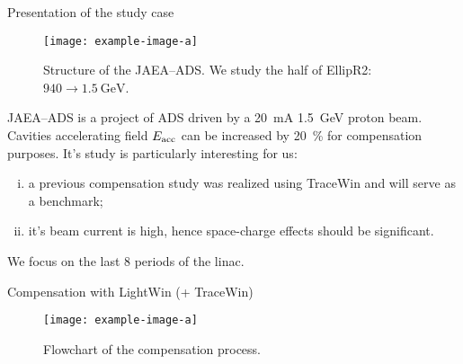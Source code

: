 \begin{frame}[t]
\begin{columns}[t]
\begin{column}{\colwidth}
         \begin{block}{Presentation of the study case}
            \begin{figure}[hbtp]
               \texttt{[image: example-image-a]}
               \caption{%
                  Structure of the JAEA--ADS.
                  \alert{We study the  half of EllipR2: \( 940 \rightarrow \SI{1.5}{\GeV} \)}.
               }
               \label{fig:jaea_structure}
            \end{figure}
            JAEA--ADS is a project of ADS driven by a \SI{20}{\mA} \SI{1.5}{\GeV} proton beam.
            Cavities accelerating field \( E_{\mathrm{acc}} \) can be increased by \SI{20}{\percent} for compensation purposes.
            It's study is particularly interesting for us:
            \begin{enumerate}[(i)]
               \item a previous compensation study was realized using TraceWin and will serve as a benchmark;
               \item it's beam current is high, hence space-charge effects should be significant.
            \end{enumerate}
            We focus on the last \num{8} periods of the linac.
         \end{block}

         \begin{block}{Compensation with LightWin (+ TraceWin)}
            \begin{figure}[hbtp]
               \texttt{[image: example-image-a]}
               \caption{Flowchart of the compensation process.}
               \label{fig:flowchart}
            \end{figure}
         \end{block}


\end{column}
\end{columns}
\end{frame}
